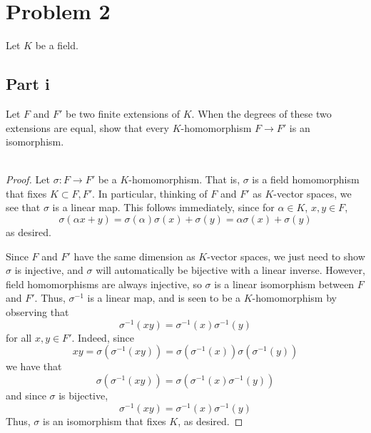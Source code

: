 \documentclass[12pt,reqno]{amsart}
\begin{document}
\newpage

\section*{Problem 2}
Let $K$ be a field.

\subsection*{Part i}
Let $F$ and $F'$ be two finite extensions of $K$. When the degrees of these two
extensions are equal, show that every $K$-homomorphism $F\to F'$ is an
isomorphism.
\\
\\
\begin{proof}
    Let $\sigma:F\to F'$ be a $K$-homomorphism. That is, $\sigma$ is a field
    homomorphism that fixes $K\subset F,F'$. In particular, thinking of $F$ and
    $F'$ as $K$-vector spaces, we see that $\sigma$ is a linear map. 
    This follows immediately, since for $\alpha\in K$, $x,y\in F$,
    \[
        \sigma(\alpha x + y) = \sigma(\alpha)\sigma(x) + \sigma(y) =
        \alpha\sigma(x) + \sigma(y)
    \]
    as desired.

    Since $F$ and $F'$ have the same dimension as $K$-vector spaces, we just
    need to show $\sigma$ is injective, and $\sigma$ will automatically be
    bijective with a linear inverse. However, field homomorphisms are always
    injective, so $\sigma$ is a linear isomorphism between $F$ and $F'$. Thus,
    $\sigma^{-1}$ is a linear map, and is seen to be a $K$-homomorphism by
    observing that 
    \[
    \sigma^{-1}(xy) = \sigma^{-1}(x)\sigma^{-1}(y)
    \]
    for all $x,y\in F'$. Indeed, since
    \[
    xy = \sigma(\sigma^{-1}(xy)) = \sigma(\sigma^{-1}(x))\sigma(\sigma^{-1}(y))
    \]
    we have that
    \[
        \sigma(\sigma^{-1}(xy))=\sigma(\sigma^{-1}(x)\sigma^{-1}(y))
    \]
    and
    since $\sigma$ is bijective,
    \[
        \sigma^{-1}(xy) = \sigma^{-1}(x)\sigma^{-1}(y)
    \]
    Thus, $\sigma$ is an isomorphism that fixes $K$, as
    desired.
\end{proof}
\end{document}
